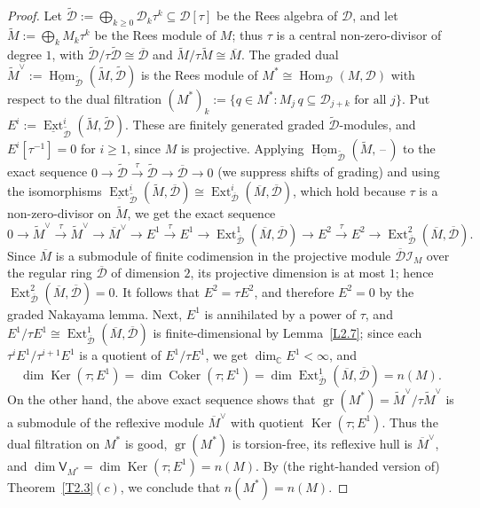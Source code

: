 \documentclass[11pt,reqno]{amsart}
\theoremstyle{plain}
\theoremstyle{definition}
\theoremstyle{remark}
\numberwithin{equation}{section}
\newcommand{\cD}{\mathcal{D}}
\newcommand{\C}{\mathbb{C}}
\newcommand{\bD}{\overline{\cD}}
\newcommand{\bM}{\overline{M}}
\DeclareMathOperator{\Hom}{Hom}
\DeclareMathOperator{\Ext}{Ext}
\DeclareMathOperator{\gr}{gr}
\DeclareMathOperator{\Ker}{Ker}
\DeclareMathOperator{\Coker}{Coker}
\begin{document}
\begin{proof}
Let $\widetilde{\cD} := \bigoplus_{k \ge 0} \cD_k \tau^k \subseteq \cD[\tau]$ be the Rees algebra
of $\cD$, and let $\widetilde{M} := \bigoplus_k M_k \tau^k$ be the Rees module of $M$; thus
$\tau$ is a central non-zero-divisor of degree $1$, with $\widetilde{\cD}/\tau \widetilde{\cD}
\cong \bD$ and $\widetilde{M}/\tau \widetilde{M} \cong \bM$. The graded dual
$\widetilde{M}^\vee := \underline{\Hom}_{\widetilde{\cD}}(\widetilde{M}, \widetilde{\cD})$ is the
Rees module of $M^* \cong \Hom_{\cD}(M, \cD)$ with respect to the dual filtration
$(M^*)_k := \{ q \in M^* : M_j\, q \subseteq \cD_{j+k} \text{ for all } j\}$. Put
$E^i := \underline{\Ext}^i_{\widetilde{\cD}}(\widetilde{M}, \widetilde{\cD})$. These are finitely
generated graded $\widetilde{\cD}$-modules, and $E^i[\tau^{-1}] = 0$ for $i \ge 1$, since $M$ is
projective. Applying $\underline{\Hom}_{\widetilde{\cD}}(\widetilde{M}, \,\text{--}\,)$ to the exact
sequence $0 \to \widetilde{\cD} \xrightarrow{\tau} \widetilde{\cD} \to \bD \to 0$ (we suppress
shifts of grading) and using the isomorphisms $\underline{\Ext}^i_{\widetilde{\cD}}(\widetilde{M},
\bD) \cong \Ext^i_{\bD}(\bM, \bD)$, which hold because $\tau$ is a non-zero-divisor on
$\widetilde{M}$, we get the exact sequence
\[
  0 \to \widetilde{M}^\vee \xrightarrow{\tau} \widetilde{M}^\vee \to \bM^\vee \to E^1
  \xrightarrow{\tau} E^1 \to \Ext^1_{\bD}(\bM, \bD) \to E^2 \xrightarrow{\tau} E^2 \to
  \Ext^2_{\bD}(\bM, \bD) .
\]
Since $\bM$ is a submodule of finite codimension in the projective module $\bD\mathcal{I}_M$ over
the regular ring $\bD$ of dimension $2$, its projective dimension is at most $1$; hence
$\Ext^2_{\bD}(\bM, \bD) = 0$. It follows that $E^2 = \tau E^2$, and therefore $E^2 = 0$ by the
graded Nakayama lemma. Next, $E^1$ is annihilated by a power of $\tau$, and $E^1/\tau E^1 \cong
\Ext^1_{\bD}(\bM, \bD)$ is finite-dimensional by Lemma~\ref{L2.7}; since each
$\tau^i E^1/\tau^{i+1} E^1$ is a quotient of $E^1/\tau E^1$, we get $\dim_{\C} E^1 < \infty$,
and
\[
  \dim \Ker(\tau; E^1) = \dim \Coker(\tau; E^1) = \dim \Ext^1_{\bD}(\bM, \bD) = n(M) .
\]
On the other hand, the above exact sequence shows that $\gr(M^*) = \widetilde{M}^\vee/\tau
\widetilde{M}^\vee$ is a submodule of the reflexive module $\bM^\vee$ with quotient
$\Ker(\tau; E^1)$. Thus the dual filtration on $M^*$ is good, $\gr(M^*)$ is torsion-free, its
reflexive hull is $\bM^\vee$, and $\dim \mathsf{V}_{M^*} = \dim \Ker(\tau; E^1) = n(M)$. By
(the right-handed version of) Theorem~\ref{T2.3}$(c)$, we conclude that $n(M^*) = n(M)$.
\end{proof}
\end{document}
